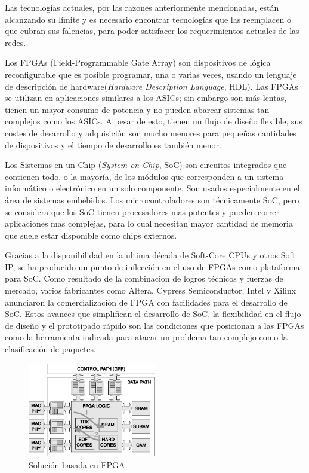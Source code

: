 Las tecnologías actuales, por las razones anteriormente mencionadas, están alcanzando su límite y es necesario encontrar tecnologías que las reemplacen o que cubran sus falencias, para poder satisfacer los requerimientos actuales de las redes. 

Los FPGAs (Field-Programmable Gate Array) son dispositivos de lógica reconfigurable que es posible programar, una o varias veces, usando un lenguaje de descripción de hardware(\textit{Hardware Description Language}, HDL). Las FPGAs se utilizan en aplicaciones similares a los ASICs; sin embargo son más lentas, tienen un mayor consumo de potencia y no pueden abarcar sistemas tan complejos como los ASICs. A pesar de esto, tienen un flujo de diseño flexible, sus costes de desarrollo y adquisición son mucho menores para pequeñas cantidades de dispositivos y el tiempo de desarrollo es también menor.


Los Sistemas en un Chip (\textit{System on Chip}, SoC) son circuitos integrados que contienen todo, o la mayoría, de los módulos que corresponden a un sistema informático o electrónico en un solo componente. Son usados especialmente en el área de sistemas embebidos. Los microcontroladores son técnicamente SoC, pero se considera que los SoC tienen procesadores mas potentes y pueden correr aplicaciones mas complejas, para lo cual necesitan mayor cantidad de memoria que suele estar disponible como chips externos. 

Gracias a la disponibilidad en la ultima década de Soft-Core CPUs y otros Soft IP, se ha producido un punto de inflección en el uso de FPGAs como plataforma para SoC. Como resultado de la combinacion de logros técnicos y fuerzas de mercado, varios fabricantes como Altera, Cypress Semiconductor, Intel y Xilinx anunciaron la comercialización de FPGA con facilidades para el desarrollo de SoC.
Estos avances que simplifican el desarrollo de SoC, la flexibilidad en el flujo de diseño y el prototipado rápido son las condiciones que posicionan a las FPGAs como la herramienta indicada para atacar un problema tan complejo como la clasificación de paquetes. 

 \begin{figure}[h]
  \centering
	 \includegraphics[width=0.5\textwidth]{1-introduccion/graf/FPGA_based.eps}
  \caption{Solución basada en FPGA}
  \label{fig:diseno}
\end{figure}


